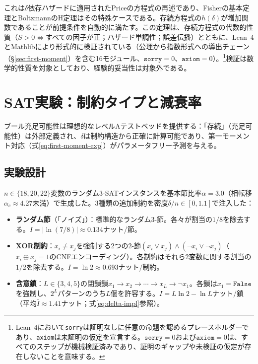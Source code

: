\documentclass[11pt,a4paper]{article}
\begin{document}
これは$\delta$依存ハザードに適用されたPriceの方程式\cite{price1970}の再述であり、Fisherの基本定理\cite{fisher1930}とBoltzmannのH定理はその特殊ケースである。存続方程式の$h(\delta)$が増加関数であることが前提条件を自動的に満たす。この定理は、存続方程式の代数的性質（$S > 0 \Leftrightarrow$すべての因子が正；ハザード単調性；誤差伝播）とともに、Lean~4 \cite{demoura2021}とMathlibにより形式的に検証されている（公理から指数形式への導出チェーン（\S\ref{sec:first-moment}）を含む16モジュール、$\texttt{sorry} = 0$、$\texttt{axiom} = 0$）。\footnote{Lean~4において\texttt{sorry}は証明なしに任意の命題を認めるプレースホルダーであり、\texttt{axiom}は未証明の仮定を宣言する。$\texttt{sorry} = 0$および$\texttt{axiom} = 0$は、すべてのステップが機械検証済みであり、証明のギャップや未検証の仮定が存在しないことを意味する。}検証は数学的性質を対象としており、経験的妥当性は対象外である。

\section{SAT実験：制約タイプと減衰率}
\label{sec:sat}

ブール充足可能性は理想的なレベルAテストベッドを提供する：「存続」（充足可能性）は外部定義され、$\delta$は制約構造から正確に計算可能であり、第一モーメント対応（式\ref{eq:first-moment-exp}）がパラメータフリー予測を与える。

\subsection{実験設計}

$n \in \{18, 20, 22\}$変数のランダム3-SATインスタンスを基本節比率$\alpha = 3.0$（相転移$\alpha_c \approx 4.27$未満）で生成した。3種類の追加制約を密度$\delta/n \in [0, 1.1]$で注入した：

\begin{itemize}
    \item \textbf{ランダム節}（「ノイズ」）：標準的なランダム3-節。各々が割当の$1/8$を除去する。$I = |\ln(7/8)| \approx 0.134$ナット/節。
    \item \textbf{XOR制約}：$x_i \neq x_j$を強制する2つの2-節$(x_i \lor x_j) \land (\neg x_i \lor \neg x_j)$（$x_i \oplus x_j = 1$のCNFエンコーディング）。各制約はそれら2変数に関する割当の$1/2$を除去する。$I = \ln 2 \approx 0.693$ナット/制約。
    \item \textbf{含意鎖}：$L \in \{3,4,5\}$の閉鎖鎖$x_1 \to x_2 \to \cdots \to x_L \to \neg x_1$。各鎖は$x_1 = \mathtt{False}$を強制し、$2^L$パターンのうち$L$個を許容する。$I = L\ln 2 - \ln L$ナット/鎖（平均$\bar{I} \approx 1.41$ナット；式\ref{eq:delta-impl}参照）。
\end{itemize}
\end{document}
